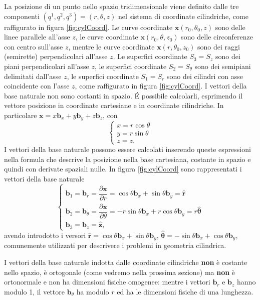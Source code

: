\begin{example}
 La posizione di un punto nello spazio tridimensionale viene definito dalle tre componenti $(q^1, q^2, q^3)=(r,\theta,z)$ nel sistema di coordinate cilindriche, come raffigurato in figura \ref{fig:cylCoord}. Le curve coordinate $\bm{x}(r_0,\theta_0,z)$ sono delle linee parallele all'asse $z$, le curve coordinate $\bm{x}(r_0,\theta,z_0)$ sono delle circonferenze con centro sull'asse $z$, mentre le curve coordinate $\bm{x}(r,\theta_0,z_0)$ sono dei raggi (semirette) perpendicolari all'asse $z$. Le superfici coordinate $S_3=S_z$ sono dei piani perpendicolari all'asse $z$, le superfici coordinate $S_2=S_{\theta}$ sono dei semipiani delimitati dall'asse $z$, le superfici coordinate $S_1 = S_r$ sono dei cilindri con asse coincidente con l'asse $z$, come raffigurato in figura \ref{fig:cylCoord}. I vettori della base naturale non sono costanti in spazio. \'E possibile calcolarli, esprimendo il vettore posizione in coordinate cartesiane e in coordinate cilindriche. In particolare $\bm{x} = x \bm{b}_x + y \bm{b}_y + z \bm{b}_z$, con
\begin{equation}
 \begin{cases}
  x = r \cos \theta \\   y = r \sin \theta \\ z = z .
 \end{cases}
\end{equation}
I vettori della base naturale possono essere calcolati inserendo queste espressioni nella formula che descrive la posizione nella base cartesiana, costante in spazio e quindi con derivate spaziali nulle. In figura \ref{fig:cylCoord} sono rappresentati i vettori della base naturale
\begin{equation}
 \begin{cases}
  \bm{b}_1 = \bm{b}_r = \dfrac{\partial \bm{x}}{\partial r} = \cos \theta \bm{b}_x + \sin \theta \bm{b}_y  = \bm{\hat{r}} \\
  \bm{b}_2 = \bm{b}_{\theta} = \dfrac{\partial \bm{x}}{\partial \theta} = -r \sin \theta \bm{b}_x + r \cos \theta \bm{b}_y = r \bm{\hat{\theta}}\\
  \bm{b}_3 =  \bm{b}_z = \bm{\hat{z}} ,
 \end{cases}
\end{equation}
avendo introdotto i versori $\bm{\hat{r}} = \cos \theta \bm{b}_x + \sin \theta \bm{b}_y$, $\bm{\hat{\theta}}= -\sin \theta \bm{b}_x + \cos \theta \bm{b}_y$, comunemente utilizzati per descrivere i problemi in geometria cilindrica.
\begin{remark}
 I vettori della base naturale indotta dalle coordinate cilindriche \textbf{non} è costante nello spazio, è ortogonale (come vedremo nella prossima sezione) ma \textbf{non} è ortonormale e non ha dimensioni fisiche omogenee: mentre i vettori $\bm{b}_r$ e $\bm{b}_z$ hanno modulo 1, il vettore $\bm{b}_\theta$ ha modulo $r$ ed ha le dimensioni fisiche di una lunghezza.
\end{remark}
\end{example}


